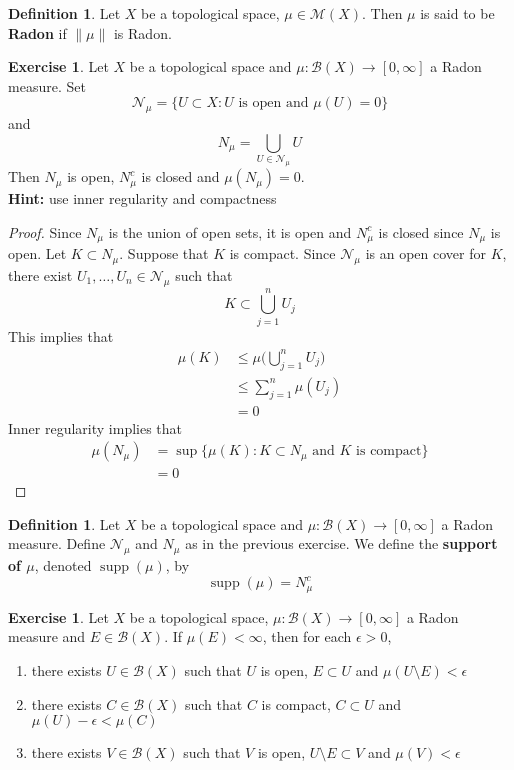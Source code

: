 \documentclass[12pt]{amsart}
\theoremstyle{definition}
\newtheorem{defn}[definition]{Definition}
\newtheorem{ex}[definition]{Exercise}
\newcommand{\ep}{\epsilon}
\newcommand{\MB}{\mathcal{B}}
\newcommand{\MN}{\mathcal{N}}
\newcommand{\MM}{\mathcal{M}}
\newcommand{\RG}{[0,\infty]}
\DeclareMathOperator{\supp}{supp}
\newcommand{\lex}[1]{\label{ex:#1}}
\newcommand{\ld}[1]{\label{defn:#1}}
\begin{document}
	\begin{defn}
		Let $X$ be a topological space, $\mu \in \MM(X)$. Then $\mu$ is said to be \textbf{Radon} if $\|\mu\|$ is Radon.  
	\end{defn}
	
	\begin{ex} \lex{00000} 
	Let $X$ be a topological space and $\mu: \MB(X) \rightarrow \RG$ a Radon measure. Set $$\MN_{\mu} = \{U \subset X: U \text{ is open and } \mu(U) = 0\}$$ and $$N_{\mu} = \bigcup_{U \in \MN_{\mu}} U$$ 
	Then $N_{\mu}$ is open, $N_{\mu}^c$ is closed and $\mu(N_{\mu}) = 0$.\\
	\textbf{Hint:} use inner regularity and compactness
	\end{ex}
	
	\begin{proof}
	Since $N_{\mu}$ is the union of open sets, it is open and $N_{\mu}^c$ is closed since $N_{\mu}$ is open. Let $K \subset N_{\mu}$. Suppose that $K$ is compact. Since $\MN_{\mu}$ is an open cover for $K$, there exist $U_1, \ldots, U_n \in \MN_{\mu}$ such that $$K \subset \bigcup_{j=1}^n U_j$$ 
	This implies that 
	\begin{align*}
	\mu(K) 
	&\leq \mu\bigg( \bigcup_{j=1}^n U_j \bigg) \\
	& \leq \sum_{j=1}^n \mu(U_j) \\
	&= 0
	\end{align*}
	Inner regularity implies that 
	\begin{align*}
	\mu(N_{\mu}) 
	&= \sup \{ \mu(K): K \subset N_{\mu} \text{ and $K$ is compact}\} \\
	&= 0
	\end{align*}
	\end{proof}
	
	\begin{defn} \ld{00000} 
	Let $X$ be a topological space and $\mu: \MB(X) \rightarrow \RG$ a Radon measure. Define $\MN_{\mu}$ and $N_{\mu}$ as in the previous exercise. We define the \textbf{support of $\mu$}, denoted $\supp(\mu)$, by $$\supp(\mu) = N_{\mu}^c $$
	\end{defn}
	
	\begin{ex} \lex{00000} 
	Let $X$ be a topological space, $\mu: \MB(X) \rightarrow \RG$ a Radon measure and $E \in \MB(X)$. If $\mu(E) < \infty$, then for each $\ep >0$, 
	\begin{enumerate}
	\item there exists $U \in \MB(X)$ such that $U$ is open, $E \subset U$ and $\mu(U \setminus E) < \ep$ 
	\item there exists $C \in \MB(X)$ such that $C$ is compact, $C \subset U$ and $\mu(U) - \ep < \mu(C)$ 
	\item there exists $V \in \MB(X)$ such that $V$ is open, $U \setminus E \subset V$ and $\mu(V) < \ep$ 
	\end{enumerate}
	\end{ex}
	
\end{document}
